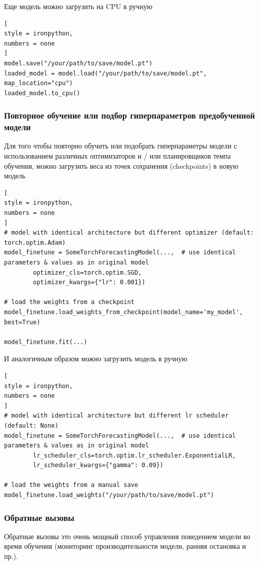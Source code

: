 \documentclass[%
	11pt,
	a4paper,
	utf8,
		]{article}
\begin{document}
Еще модель можно загрузить на CPU в ручную
\begin{lstlisting}[
style = ironpython,
numbers = none
]
model.save("/your/path/to/save/model.pt")
loaded_model = model.load("/your/path/to/save/model.pt", map_location="cpu")
loaded_model.to_cpu()
\end{lstlisting}

\subsubsection{Повторное обучение или подбор гиперпараметров предобученной модели}

Для того чтобы повторно обучить или подобрать гиперпараметры модели с использованием различных оптимизаторов и / или планировщиков темпа обучения, можно загрузить веса из точек сохранения (checkpoints) в новую модель
\begin{lstlisting}[
style = ironpython,
numbers = none
]
# model with identical architecture but different optimizer (default: torch.optim.Adam)
model_finetune = SomeTorchForecastingModel(...,  # use identical parameters & values as in original model
		optimizer_cls=torch.optim.SGD,
		optimizer_kwargs={"lr": 0.001})

# load the weights from a checkpoint
model_finetune.load_weights_from_checkpoint(model_name='my_model', best=True)

model_finetune.fit(...)
\end{lstlisting}

И аналогичным образом можно загрузить модель в ручную
\begin{lstlisting}[
style = ironpython,
numbers = none
]
# model with identical architecture but different lr scheduler (default: None)
model_finetune = SomeTorchForecastingModel(...,  # use identical parameters & values as in original model
		lr_scheduler_cls=torch.optim.lr_scheduler.ExponentialLR,
		lr_scheduler_kwargs={"gamma": 0.09})

# load the weights from a manual save
model_finetune.load_weights("/your/path/to/save/model.pt")
\end{lstlisting}

\subsubsection{Обратные вызовы}

Обратные вызовы это очень мощный способ управления поведением модели во время обучения (мониторинг производительности модели, ранняя остановка и пр.).
\end{document}
